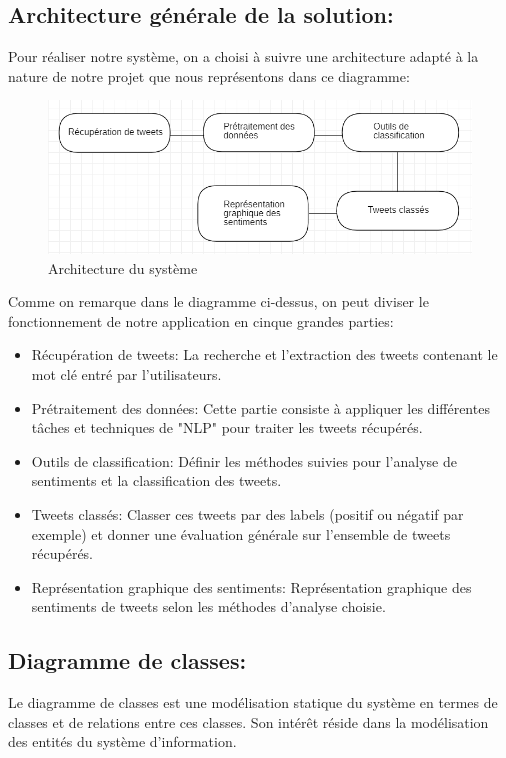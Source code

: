 \subsection{Architecture générale de la solution:}
Pour réaliser notre système, on a choisi à suivre une architecture adapté à la nature de notre projet que nous représentons dans ce diagramme:
\begin{figure}[H]
    \centering
    \includegraphics[width=\textwidth]{etude-theorique-conception/assets/architecture.png}
    \caption{Architecture du système}
    \label{fig:my_label}
\end{figure}
Comme on remarque dans le diagramme ci-dessus, on peut diviser le fonctionnement de notre application en cinque grandes parties:
\begin{itemize}
    \item \textcolor{DispositionColor}{Récupération de tweets:} La recherche et l'extraction des tweets contenant le mot clé entré par l'utilisateurs.
    \item \textcolor{DispositionColor}{Prétraitement des données:} Cette partie consiste à appliquer les différentes tâches et techniques de "NLP" pour traiter les tweets récupérés.
    \item \textcolor{DispositionColor}{Outils de classification:} Définir les méthodes suivies pour l'analyse de sentiments et la classification des tweets. 
    \item \textcolor{DispositionColor}{Tweets classés:} Classer ces tweets par des labels (positif ou négatif par exemple) et donner une évaluation générale sur l'ensemble de tweets récupérés.  
    \item \textcolor{DispositionColor}{Représentation graphique des sentiments:} Représentation graphique des sentiments de tweets selon les méthodes d'analyse choisie.
\end{itemize}
\subsection{Diagramme de classes:}
Le diagramme de classes est une modélisation statique du système en termes de classes et
de relations entre ces classes. Son intérêt réside dans la modélisation des entités du
système d'information.\\

